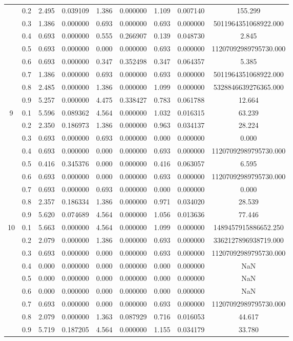 \begin{longtable}{ | c | c || c | c | c | c | c | c | c | }
 & 0.2 & 2.495 & 0.039109 & 1.386 & 0.000000 & 1.109 & 0.007140 & 155.299 \\
 & 0.3 & 1.386 & 0.000000 & 0.693 & 0.000000 & 0.693 & 0.000000 & 5011964351068922.000 \\
 & 0.4 & 0.693 & 0.000000 & 0.555 & 0.266907 & 0.139 & 0.048730 & 2.845 \\
 & 0.5 & 0.693 & 0.000000 & 0.000 & 0.000000 & 0.693 & 0.000000 & 11207092989795730.000 \\
 & 0.6 & 0.693 & 0.000000 & 0.347 & 0.352498 & 0.347 & 0.064357 & 5.385 \\
 & 0.7 & 1.386 & 0.000000 & 0.693 & 0.000000 & 0.693 & 0.000000 & 5011964351068922.000 \\
 & 0.8 & 2.485 & 0.000000 & 1.386 & 0.000000 & 1.099 & 0.000000 & 5328846639276365.000 \\
 & 0.9 & 5.257 & 0.000000 & 4.475 & 0.338427 & 0.783 & 0.061788 & 12.664 \\
 \hline
\multirow{9}{*}{9} & 0.1 & 5.596 & 0.089362 & 4.564 & 0.000000 & 1.032 & 0.016315 & 63.239 \\
 & 0.2 & 2.350 & 0.186973 & 1.386 & 0.000000 & 0.963 & 0.034137 & 28.224 \\
 & 0.3 & 0.693 & 0.000000 & 0.693 & 0.000000 & 0.000 & 0.000000 & 0.000 \\
 & 0.4 & 0.693 & 0.000000 & 0.000 & 0.000000 & 0.693 & 0.000000 & 11207092989795730.000 \\
 & 0.5 & 0.416 & 0.345376 & 0.000 & 0.000000 & 0.416 & 0.063057 & 6.595 \\
 & 0.6 & 0.693 & 0.000000 & 0.000 & 0.000000 & 0.693 & 0.000000 & 11207092989795730.000 \\
 & 0.7 & 0.693 & 0.000000 & 0.693 & 0.000000 & 0.000 & 0.000000 & 0.000 \\
 & 0.8 & 2.357 & 0.186334 & 1.386 & 0.000000 & 0.971 & 0.034020 & 28.539 \\
 & 0.9 & 5.620 & 0.074689 & 4.564 & 0.000000 & 1.056 & 0.013636 & 77.446 \\
 \hline
\multirow{9}{*}{10} & 0.1 & 5.663 & 0.000000 & 4.564 & 0.000000 & 1.099 & 0.000000 & 1489457915886652.250 \\
 & 0.2 & 2.079 & 0.000000 & 1.386 & 0.000000 & 0.693 & 0.000000 & 3362127896938719.000 \\
 & 0.3 & 0.693 & 0.000000 & 0.000 & 0.000000 & 0.693 & 0.000000 & 11207092989795730.000 \\
 & 0.4 & 0.000 & 0.000000 & 0.000 & 0.000000 & 0.000 & 0.000000 & NaN \\
 & 0.5 & 0.000 & 0.000000 & 0.000 & 0.000000 & 0.000 & 0.000000 & NaN \\
 & 0.6 & 0.000 & 0.000000 & 0.000 & 0.000000 & 0.000 & 0.000000 & NaN \\
 & 0.7 & 0.693 & 0.000000 & 0.000 & 0.000000 & 0.693 & 0.000000 & 11207092989795730.000 \\
 & 0.8 & 2.079 & 0.000000 & 1.363 & 0.087929 & 0.716 & 0.016053 & 44.617 \\
 & 0.9 & 5.719 & 0.187205 & 4.564 & 0.000000 & 1.155 & 0.034179 & 33.780 \\
 \hline
\hline
\end{longtable}
 
